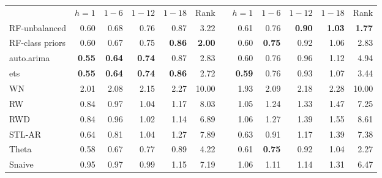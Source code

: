 \documentclass[11pt,a4paper,]{article}
\begin{document}
\begin{table}[!htbp]
\begin{tabular}{lrrrrrrrrrrr}
                     &    $h=1$ &    $1-6$   &     $1-12$ &    $1-18$  &   Rank     &            &   $h=1$  &    $1-6$   &    $1-12$  &    $1-18$  &   Rank \\\cmidrule(lr){2-6} \cmidrule(lr){8-12}
RF-unbalanced        &       0.60 &       0.68 &       0.76 &       0.87 &       3.22 &            &       0.61 &       0.76 & {\bf 0.90} & {\bf 1.03} &       {\bf 1.77} \\
RF-class priors      &       0.60 &       0.67 & 0.75 & {\bf 0.86} &       {\bf 2.00} &            &       0.60 &       {\bf 0.75} &       0.92 &       1.06 &        2.83 \\
auto.arima           &      {\bf 0.55 }&      {\bf 0.64} &      {\bf 0.74} &       0.87 &       2.83 &            &       0.60 &       0.76 &       0.96 &       1.12 &       4.94 \\
ets                  & {\bf 0.55} & {\bf 0.64} & {\bf 0.74} &       {\bf 0.86} & 2.72 &            &      {\bf 0.59} &       0.76 &       0.93 &       1.07 &       3.44 \\
WN                   &       2.01 &       2.08 &       2.15 &       2.27 &      10.00 &            &       1.93 &       2.09 &       2.18 &       2.28 &      10.00 \\
RW                   &       0.84 &       0.97 &       1.04 &       1.17 &    8.03 &            &       1.05 &       1.24 &       1.33 &       1.47 &      7.25 \\
RWD                  &       0.84 &       0.96 &       1.02 &       1.14 &       6.89 &            &       1.06 &       1.27 &       1.39 &       1.55 &      8.61 \\
STL-AR               &       0.64 &       0.81 &       1.04 &       1.27 &       7.89 &            &       0.63 &       0.91 &       1.17 &       1.39 &       7.38 \\
Theta                &       0.58 &       0.67 &       0.77 &       0.89 &       4.22 &            & 0.61 & {\bf 0.75} &       0.92 &       1.04 & 2.27 \\
Snaive               &       0.95 &       0.97 &       0.99 &       1.15 &       7.19 &            &       1.06 &       1.11 &       1.14 &       1.31 &       6.47 \\
\bottomrule
\end{tabular}
\end{table}
\end{document}
